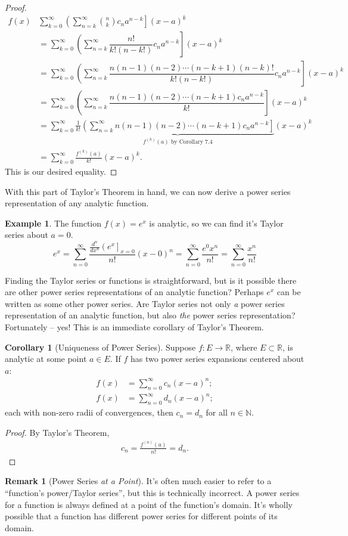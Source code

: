 \documentclass{article}
\newcommand{\N}{\mathbb{N}}
\newcommand{\R}{\mathbb{R}}
\theoremstyle{definition}
\newtheorem{corollary}{Corollary}[section]
\newtheorem{example}{Example}[section]
\newtheorem{remark}{Remark}[section]
\begin{document}
\begin{proof}
\begin{align*}
			f(x) & \sum_{k=0}^{\infty}\left(\sum_{n=k}^{\infty}\binom{n}{k}c_na^{n-k}\right](x-a)^k\\
			& = \sum_{k=0}^{\infty}\left(\sum_{n=k}^{\infty}\dfrac{n!}{k!(n-k!)}c_na^{n-k}\right](x-a)^k\\
			& = \sum_{k=0}^{\infty}\left(\sum_{n=k}^{\infty}\dfrac{n(n-1)(n-2)\cdots(n-k+1)(n-k)!}{k!(n-k!)}c_na^{n-k}\right](x-a)^k\\
			& = \sum_{k=0}^{\infty}\left(\sum_{n=k}^{\infty}\dfrac{n(n-1)(n-2)\cdots(n-k+1)c_na^{n-k}}{k!}\right](x-a)^k\\
			& = \sum_{k=0}^{\infty}\frac{1}{k!}\underbrace{\left(\sum_{n=k}^{\infty}n(n-1)(n-2)\cdots (n-k+1)c_na^{n-k}\right]}_{f^{(k)}(a) \text{ by Corollary 7.4}}(x-a)^k\\
			& = \sum_{k=0}^{\infty}\frac{f^{(k)}(a) }{k!}(x-a)^k.
		\end{align*}
		This is our desired equality. 
	\end{proof}
	
	With this part of Taylor's Theorem in hand, we can now derive a power series representation of any analytic function.
	\begin{example}
		The function $ f(x)=e^x $ is analytic, so we can find it's Taylor series about $ a = 0 $. 
		$$ e^x=\sum_{n=0}^{\infty}\frac{\frac{d^n}{dx^n}\left(e^x\right]_{x=0} }{n!}(x-0)^n = \sum_{n=0}^{\infty}\frac{e^0x^n}{n!} = \sum_{n=0}^{\infty}\frac{x^n}{n!} $$
	\end{example}
	Finding the Taylor series or functions is straightforward, but is it possible there are other power series representations of an analytic function? Perhaps $ e^x $ can be written as some other power series. Are Taylor series not only \textit{a} power series representation of an analytic function, but also \textit{the} power series representation? Fortunately -- yes! This is an immediate corollary of Taylor's Theorem. 
	
	\begin{corollary}[Uniqueness of Power Series]
		Suppose $ f:E\to\R $, where $ E\subset\R $, is analytic at some point $ a\in E $. If $ f $ has two power series expansions centered about $ a $:
		\begin{align*}
			f(x)&=\sum_{n=0}^{\infty}c_n(x-a)^n;\\
			f(x)&=\sum_{n=0}^{\infty}d_n(x-a)^n;
		\end{align*}
		each with non-zero radii of convergences, then $ c_n = d_n $ for all $ n\in\N $. 
	\end{corollary} 
	\begin{proof}
		By Taylor's Theorem,
		\begin{align*}
			c_n=\frac{f^{(n)}(a) }{n!}=d_n.
		\end{align*}
	\end{proof}
	\begin{remark}[Power Series \textit{at a Point}]
		It's often much easier to refer to a ``function's power/Taylor series'', but this is technically incorrect. A power series for a function is always defined at a point of the function's domain. It's wholly possible that a function has different power series for different points of its domain.
	\end{remark}
	
\end{document}
